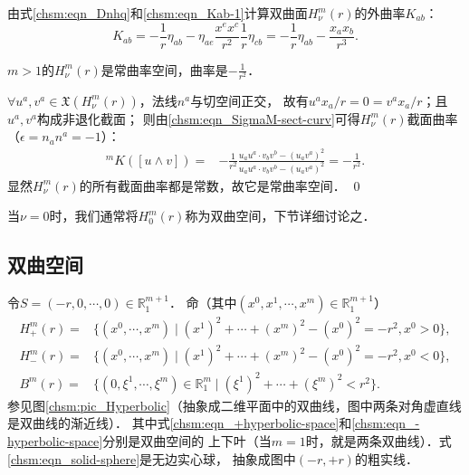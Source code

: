 由式\eqref{chsm:eqn_Dnhq}和\eqref{chsm:eqn_Kab-1}计算双曲面$H^m_{\nu}(r)$的外曲率$K_{ab}$：
\begin{equation}\label{chsm:eqn_phKab}
    K_{ab} %
    =-\frac{1}{r}\eta_{ab}-
    \eta_{ae} \frac{x^e x^c}{r^2}  \frac{1}{r}\eta_{cb}
    =-\frac{1}{r}\eta_{ab}- \frac{x_a x_b}{r^3} .
\end{equation}

\begin{example}\label{chsm:exm_HK}
    $m>1$的$H^m_\nu(r)$是常曲率空间，曲率是$-\frac{1}{r^2}$．
\end{example}
$\forall u^a,v^a\in \mathfrak{X}(H^m_\nu(r))$，法线$n^a$与切空间正交，
故有$ u^ax_a/r =0 = v^a x_a/r$；且$u^a,v^a$构成非退化截面；
则由\eqref{chsm:eqn_SigmaM-sect-curv}可得$H^m_\nu(r)$截面曲率（$\epsilon=n_a n^a=-1$）：
\begin{align*}   
    {}^{m} K([u\wedge v]) 
    =&-\frac{1}{r^2}
    \frac{ {u}_a{u}^a \cdot {v}_b{v}^b - ({u}_a{v}^a)^2 }
    {{u}_a{u}^a \cdot {v}_b{v}^b - ({u}_a{v}^a)^2 }
    =-\frac{1}{r^2} .
\end{align*}
显然$H^m_\nu(r)$的所有截面曲率都是常数，故它是常曲率空间．
\qed

当$\nu=0$时，我们通常将$H^m_0(r)$称为双曲空间，下节详细讨论之．



\subsection{双曲空间}\label{chsm:sec_hyperbolic}
令$S=(-r,0,\cdots,0)\in \mathbb{R}^{m+1}_1$．
命（其中$(x^0,x^1,\cdots,x^{m})\in \mathbb{R}^{m+1}_1$）
\begin{align}
    H^m_{+}(r) = & \bigl\{(x^0,\cdots,x^{m})\mid (x^1)^2+\cdots+(x^m)^2 - (x^{0})^2 = -r^2,
    x^{0} >0\bigr\} , \label{chsm:eqn_+hyperbolic-space} \\
    H^m_{-}(r) = & \bigl\{(x^0,\cdots,x^{m})\mid (x^1)^2+\cdots+(x^m)^2 - (x^{0})^2 = -r^2,
    x^{0} <0\bigr\} , \label{chsm:eqn_-hyperbolic-space} \\
    B^m(r) = & \bigl\{(0,\xi^1,\cdots,\xi^{m})\in \mathbb{R}^{m}_1 \mid
    (\xi^1)^2+\cdots+(\xi^m)^2 < r^2\bigr\} . \label{chsm:eqn_solid-sphere}
\end{align} %
参见图\ref{chsm:pic_Hyperbolic}（抽象成二维平面中的双曲线，图中两条对角虚直线是双曲线的渐近线）．
其中式\eqref{chsm:eqn_+hyperbolic-space}和\eqref{chsm:eqn_-hyperbolic-space}分别是{\heiti 双曲空间}的
上下叶（当$m=1$时，就是两条双曲线）．式\eqref{chsm:eqn_solid-sphere}是无边实心球，
抽象成图中$(-r,+r)$的粗实线．

